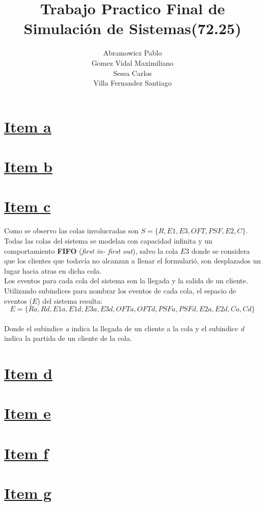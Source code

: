 \documentclass[a4paper,10pt]{article}
\title{Trabajo Practico Final de Simulaci\'on de Sistemas(72.25)}
\author{
Abramowicz Pablo\\
Gomez Vidal Maximiliano\\
Sessa Carlos\\
Villa Fernandez Santiago\\
}
\begin{document}
\maketitle

\section*{\underline{Item a}}
\section*{\underline{Item b}}
\section*{\underline{Item c}}
Como se observo las colas involucradas son $S = \{R, E1, E3, OFT, PSF, E2, C\}$.\\
Todas las colas del sistema se modelan con capacidad infinita y un comportamiento \textbf{FIFO} (\textit{first in- first out}), salvo la cola $E3$ 
donde se considera que los clientes que todav\'ia no alcanzan a llenar el formulari\'o, son desplazados un lugar hacia atras en dicha cola.\\
Los eventos para cada cola del sistema son la llegada y la salida de un cliente.
Utilizando subindices para nombrar los eventos de cada cola, el espacio de eventos ($E$) del sistema resulta:\\
$$E = \{Ra , Rd , E1a , E1d , E3a , E3d , OFTa , OFTd , PSFa , PSFd , E2a , E2d , Ca , Cd \}$$\\
Donde el subindice \textit{a} indica la llegada de un cliente a la cola y el subindice \textit{d} indica la partida de un cliente de la cola.

\section*{\underline{Item d}}
\section*{\underline{Item e}}
\section*{\underline{Item f}}
\section*{\underline{Item g}}
\end{document}
